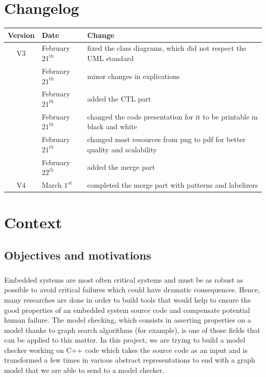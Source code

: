 \documentclass{report}
\begin{document}
\chapter*{Changelog}
\begin{center}
\begin{tabular}{|c|l|l|}
  \hline
  Version & Date & Change  \\
  \hline
  V3 & February $21^{th}$  & fixed the class diagrams, which did not respect the UML standard \\
  & February $21^{th}$ & minor changes in explications \\
  & February $21^{th}$ & added the CTL part \\
  & February $21^{th}$ & changed the code presentation for it to be printable in black and white \\
  & February $21^{th}$ & changed most resources from png to pdf for better quality and scalability \\
  & February $22^{th}$ & added the merge part \\
  \hline
  V4 & March $1^{st}$ & completed the merge part with patterns and labelizers \\
 \hline
\end{tabular}
\end{center}
\chapter{Context}

\section{Objectives and motivations}

\paragraph{}
\hspace{4mm}Embedded systems are most often critical systems and must be as robust as possible to avoid critical failures which could have dramatic consequences.
Hence, many researches are done in order to build tools that would help to ensure the good properties of an embedded system source code and compensate potential human
failure. The model checking, which consists in asserting properties on a model thanks to graph search algorithms (for example), is one of those fields that can be
applied to this matter. In this project, we are trying to build a model checker working on C++ code which takes the source code as an input and is transformed a few times
in various abstract representations to end with a graph model that we are able to send to a model checker.
\end{document}

